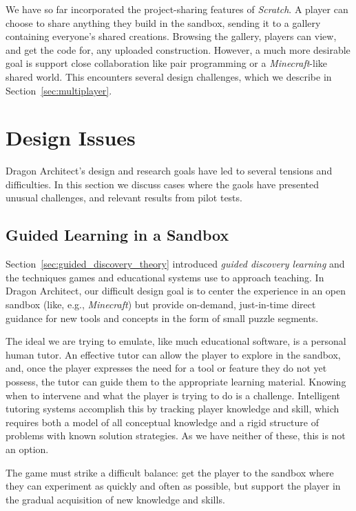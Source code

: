 \documentclass{sig-alternate}
\newcommand{\gametitle}{{Dragon Architect}}
\begin{document}
We have so far incorporated the project-sharing features of \emph{Scratch}.
A player can choose to share anything they build in the sandbox, sending it to a gallery containing everyone's shared creations.
Browsing the gallery, players can view, and get the code for, any uploaded construction.
However, a much more desirable goal is support close collaboration like pair programming or a \emph{Minecraft}-like shared world.
This encounters several design challenges, which we describe in Section~\ref{sec:multiplayer}.

\section{Design Issues}
\gametitle{}'s design and research goals have led to several tensions and difficulties.
In this section we discuss cases where the gaols have presented unusual challenges, and relevant results from pilot tests.

\subsection{Guided Learning in a Sandbox}
\label{sec:direct_guidance}

Section~\ref{sec:guided_discovery_theory} introduced \emph{guided discovery learning} and the techniques games and educational systems use to approach teaching.
In \gametitle{}, our difficult design goal is to center the experience in an open sandbox (like, e.g., \emph{Minecraft}) but provide on-demand, just-in-time direct guidance for new tools and concepts in the form of small puzzle segments.

The ideal we are trying to emulate, like much educational software, is a personal human tutor.
An effective tutor can allow the player to explore in the sandbox, and, once the player expresses the need for a tool or feature they do not yet possess, the tutor can guide them to the appropriate learning material.
Knowing when to intervene and what the player is trying to do is a challenge.
Intelligent tutoring systems accomplish this by tracking player knowledge and skill, which requires both a model of all conceptual knowledge and a rigid structure of problems with known solution strategies.
As we have neither of these, this is not an option.

The game must strike a difficult balance: get the player to the sandbox where they can experiment as quickly and often as possible, but support the player in the gradual acquisition of new knowledge and skills. 
\end{document}
